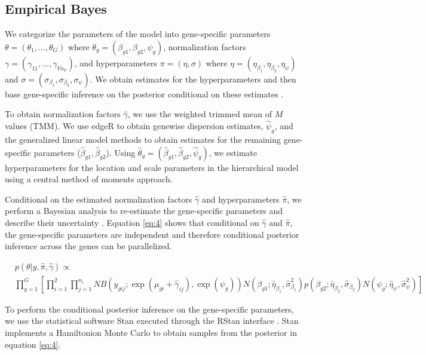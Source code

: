 \documentclass[11pt]{isuthesis}
\begin{document}
\subsection{Empirical Bayes}

We categorize the parameters of the model into gene-specific parameters $\theta = (\theta_1, ..., \theta_G)$ where $\theta_g = (\beta_{g1}, \beta_{g2}, \psi_g)$, normalization factors $\gamma = (\gamma_{11}, ..., \gamma_{V n_V})$, and hyperparameters $\pi = (\eta, \sigma)$ where $\eta = (\eta_{\beta_1}, \eta_{\beta_2}, \eta_\psi)$ and $\sigma = (\sigma_{\beta_1}, \sigma_{\beta_2}, \sigma_\psi)$. We obtain estimates for the hyperparameters and then base gene-specific inference on the posterior conditional on these estimates \citep{niemi2015empirical}.

To obtain normalization factors $\hat{\gamma}$, we use the weighted trimmed mean of $M$ values (TMM). We use edgeR to obtain genewise dispersion estimates, $\hat{\psi}_g$, and the generalized linear model methods to obtain estimates for the remaining gene-specific parameters ($\hat{\beta}_{g1}, \hat{\beta}_{g2}$)\citep{robinson2010scaling}. Using $\hat{\theta}_g = (\hat{\beta}_{g1} , \hat{\beta}_{g2}, \hat{\psi}_g)$, we estimate hyperparameters for the location and scale parameters in the hierarchical model using a central method of moments approach. 

Conditional on the estimated normalization factors $\hat{\gamma}$ and hyperparameters $\hat{\pi}$, we perform a Bayesian analysis to re-estimate the gene-specific parameters and describe their uncertainty \citep{niemi2015empirical}. Equation \ref{eq:4} shows that conditional on $\hat{\gamma}$ and $\hat{\pi}$, the gene-specific parameters are independent and therefore conditional posterior inference across the genes can be parallelized. 

\begin{equation}
\label{eq:4}
\begin{split}
& p(\theta | y, \hat{\pi}, \hat{\gamma})  \propto \\ & \prod_{g=1}^{G} \left[ \prod_{i=1}^{2} \prod_{j=1}^{n_i} NB(y_{gij} ; \exp(\mu_{gi} + \hat{\gamma}_{ij}), \exp(\psi_g)) N(\beta_{g1} ; \hat{\eta}_{\beta_1}, \hat{\sigma}^2_{\beta_1}) p(\beta_{g2} ; \hat{\eta}_{\beta_2}, \hat{\sigma}_{\beta_2}) N(\psi_g ; \hat{\eta}_{\psi}, \hat{\sigma}^2_{\psi})  \right]
\end{split}
\end{equation}

To perform the conditional posterior inference on the gene-specific parameters, we use the statistical software Stan \citep{stan2014stan} executed through the RStan interface \citep{team2016rstan}. Stan implements a Hamiltonion Monte Carlo \citep{neal2011mcmc} to obtain samples from the posterior in equation \ref{eq:4}. 
\end{document}
